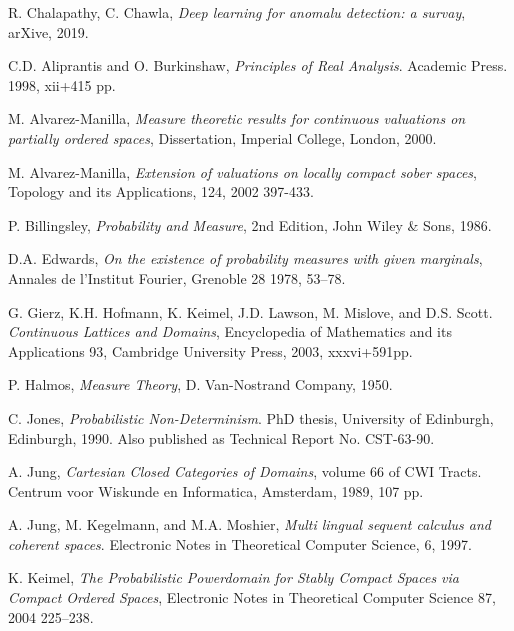 \documentclass[12pt,a4paper]{article}
\theoremstyle{definition}
\theoremstyle{theorem}
\theoremstyle{definition}
\begin{document}
	\small
\begin{thebibliography}{99}

\begin{LTRitems}

\resetlatinfont

R. Chalapathy, C. Chawla, {\em Deep learning for anomalu detection: a survay},  arXive, 2019.

C.D. Aliprantis and O. Burkinshaw,   {\em Principles of Real Analysis}.  Academic Press.  1998,  xii+415 pp.

M. Alvarez-Manilla, {\em Measure theoretic results for continuous valuations on partially ordered
spaces}, Dissertation, Imperial College, London, 2000.

M. Alvarez-Manilla, {\em Extension of valuations on locally compact sober spaces}, Topology and its
Applications, 124, 2002 397-433.

P. Billingsley, {\em Probability and Measure}, 2nd Edition, John Wiley \& Sons, 1986.

D.A. Edwards, {\em On the existence of probability measures with given marginals}, Annales de
l’Institut Fourier, Grenoble 28 1978, 53–78.

G. Gierz, K.H. Hofmann, K. Keimel, J.D. Lawson, M. Mislove, and D.S. Scott. {\em Continuous
Lattices and Domains}, Encyclopedia of Mathematics and its Applications 93, Cambridge
University Press, 2003, xxxvi+591pp.

P. Halmos, {\em Measure Theory}, D. Van-Nostrand Company, 1950.

C. Jones,  {\em Probabilistic Non-Determinism}. PhD thesis, University of Edinburgh, Edinburgh,
1990. Also published as Technical Report No. CST-63-90.

A. Jung,  {\em Cartesian Closed Categories of Domains}, volume 66 of CWI Tracts. Centrum voor
Wiskunde en Informatica, Amsterdam, 1989, 107 pp.

A. Jung, M. Kegelmann, and M.A. Moshier,  {\em Multi lingual sequent calculus and coherent spaces}.
Electronic Notes in Theoretical Computer Science, 6, 1997.

K. Keimel, {\em The Probabilistic Powerdomain for Stably Compact Spaces via Compact Ordered Spaces}, Electronic Notes in Theoretical Computer Science 87, 2004 225–238.


\end{LTRitems}
\end{thebibliography}
\end{document}
